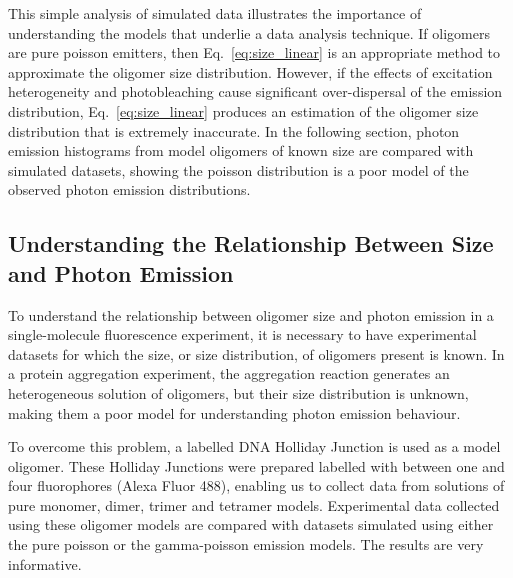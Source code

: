This simple analysis of simulated data illustrates the importance of understanding the models that underlie a data analysis technique. If oligomers are pure poisson emitters, then Eq.~\ref{eq:size_linear} is an appropriate method to approximate the oligomer size distribution. However, if the effects of excitation heterogeneity and photobleaching cause significant over-dispersal of the emission distribution, Eq.~\ref{eq:size_linear} produces an estimation of the oligomer size distribution that is extremely inaccurate. In the following section, photon emission histograms from model oligomers of known size are compared with simulated datasets, showing the poisson distribution is a poor model of the observed photon emission distributions.   

\subsection{Understanding the Relationship Between Size and Photon Emission}
To understand the relationship between oligomer size and photon emission in a single-molecule fluorescence experiment, it is necessary to have experimental datasets for which the size, or size distribution, of oligomers present is known. In a protein aggregation experiment, the aggregation reaction generates an heterogeneous solution of oligomers, but their size distribution is unknown, making them a poor model for understanding photon emission behaviour. 

To overcome this problem, a labelled DNA Holliday Junction is used as a model oligomer. These Holliday Junctions were prepared labelled with between one and four fluorophores (Alexa Fluor 488), enabling us to collect data from solutions of pure monomer, dimer, trimer and tetramer models. Experimental data collected using these oligomer models are compared with datasets simulated using either the pure poisson or the gamma-poisson emission models. The results are very informative.

